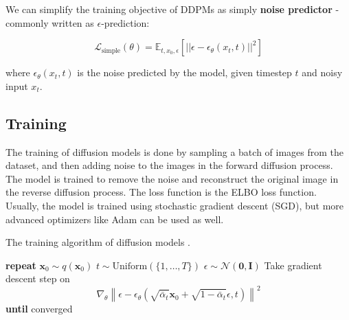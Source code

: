 We can simplify the training objective of DDPMs as simply \textbf{noise predictor} - commonly written as $\epsilon$-prediction:

\begin{equation}
    \boxed{\mathcal{L}_\text{simple} (\theta) = \mathbb{E}_{t,x_0, \epsilon} \left[ \left| \left| \epsilon - \epsilon_\theta (x_t, t) \right| \right|^2 \right]}
    \label{eq:ddpm_loss}
\end{equation}

where $\epsilon_\theta (x_t, t)$ is the noise predicted by the model, given timestep $t$ and noisy input $x_t$.







\subsection{Training}

The training of diffusion models is done by sampling a batch of images from the dataset, and then adding noise to the images in the forward diffusion process. The model is trained to remove the noise and reconstruct the original image in the reverse diffusion process. The loss function is the ELBO loss function. Usually, the model is trained using stochastic gradient descent (SGD), but more advanced optimizers like Adam can be used as well.





\begin{algorithm}
    \caption{The training algorithm of diffusion models \cite{ddpm}.}
    \label{alg:ddpm_training}
    \begin{algorithmic}[1] %
        \State \textbf{repeat}
        \State \hspace{5pt} $ \mathbf{x}_0 \sim q(\mathbf{x}_0) $
        \State \hspace{5pt} $ t \sim \text{Uniform}(\{1, \dots, T\}) $
        \State \hspace{5pt} $ \epsilon \sim \mathcal{N}(\mathbf{0}, \mathbf{I}) $
        \State \hspace{5pt} Take gradient descent step on
        \[
        \nabla_{\theta} \left\| \epsilon - \epsilon_{\theta} \left( \sqrt{\bar{\alpha}_t} \mathbf{x}_0 + \sqrt{1 - \bar{\alpha}_t} \epsilon, t \right) \right\|^2
        \]
        \State \textbf{until} converged
    \end{algorithmic}
\end{algorithm}





